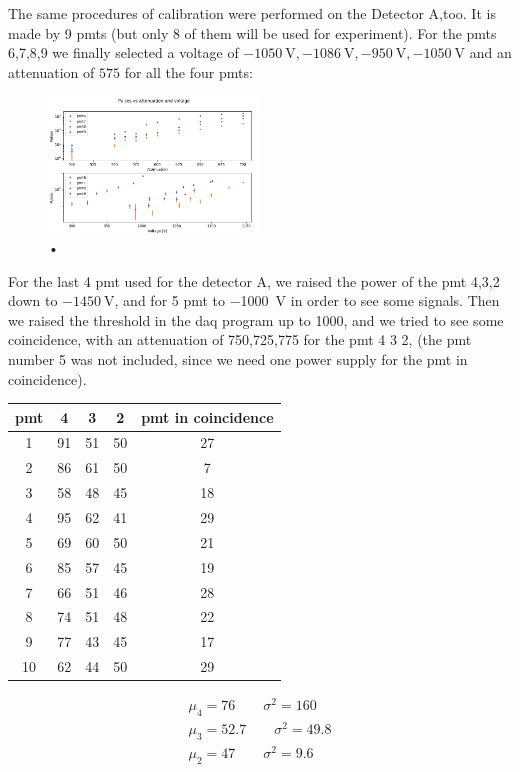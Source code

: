 \documentclass[10pt,a4paper]{article}
\begin{document}
The same procedures of calibration were performed on the Detector A,too. It is made by 9 pmts (but only 8 of them will be used for experiment). For the pmts 6,7,8,9 we finally selected a voltage of $\SI{-1050}{\volt}, \SI{-1086}{\volt}, \SI{-950}{\volt}, \SI{-1050}{\volt} $ and an attenuation of $575$ for all the four pmts:

\begin{figure}[hbtp]
\centering
\includegraphics[width= 0.5\textwidth]{figures/AttenuationA6789.png}
\caption{•}
\end{figure}


For the last 4 pmt used for the detector A, we raised the power of the pmt 4,3,2 down to $\SI{-1450}{\volt}$, and for 5 pmt to \SI{-1000}{\volt} in order to see some signals. Then we raised the threshold in the daq program up to 1000, and we tried to see some coincidence, with an attenuation of 750,725,775 for the pmt 4 3 2, (the pmt number 5 was not included, since we need one power supply for the pmt in coincidence). 
\begin{center}
\begin{tabular}{|c|c|c|c|c|}
\hline 
pmt & 4 & 3 & 2 & pmt in coincidence \\ 
\hline 
1 & 91 & 51 & 50 & 27 \\ 
\hline 
2 & 86 & 61 & 50 & 7 \\ 
\hline 
3 & 58 & 48 & 45 & 18 \\ 
\hline 
4 & 95 & 62 & 41 & 29 \\ 
\hline 
5 & 69 & 60 & 50 & 21 \\ 
\hline 
6 & 85 & 57 & 45 & 19 \\ 
\hline 
7 & 66 & 51 & 46 & 28 \\ 
\hline 
8 & 74 & 51 & 48 & 22 \\ 
\hline 
9 & 77 & 43 & 45 & 17 \\ 
\hline 
10 & 62 & 44 & 50 & 29 \\ 
\hline 
\end{tabular} 
\end{center}

\begin{equation*}
\begin{split}
\mu_{4} = 76 \qquad \sigma^{2} =160  \\
\mu_{3} = 52.7 \qquad \sigma^{2} = 49.8 \\
\mu_{2} = 47  \qquad \sigma^{2} = 9.6
\end{split}
\end{equation*}
\end{document}
